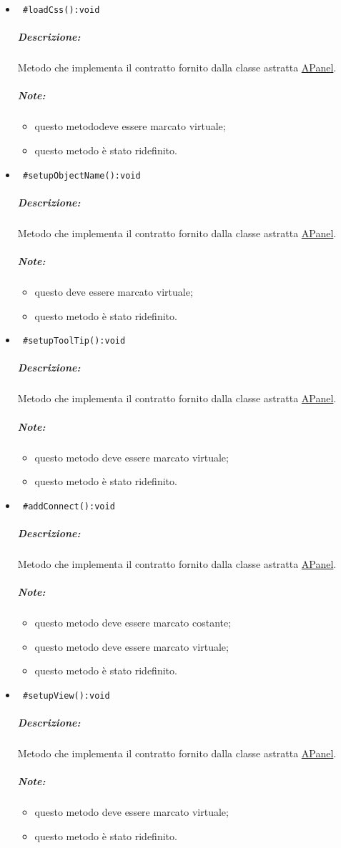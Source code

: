 \begin{itemize}
\item\color{blue}\verb! #loadCss():void!
\color{black} 
\subparagraph{Descrizione: }Metodo che implementa il contratto fornito dalla classe astratta \hyperref[speAPanel]{APanel}.
 \subparagraph{Note:}
 \begin{itemize}
  \item questo metododeve essere marcato virtuale;
 \item questo metodo è stato ridefinito.
 \end{itemize}
 
\item\color{blue}\verb! #setupObjectName():void!
\color{black}
\subparagraph{Descrizione: }Metodo che implementa il contratto fornito dalla classe astratta \hyperref[speAPanel]{APanel}.
 \subparagraph{Note:}
 \begin{itemize}
  \item questo deve essere marcato virtuale;
 \item questo metodo è stato ridefinito.
 \end{itemize}
 
\item\color{blue}\verb! #setupToolTip():void!
\color{black}
\subparagraph{Descrizione: }Metodo che implementa il contratto fornito dalla classe astratta \hyperref[speAPanel]{APanel}.
 \subparagraph{Note:}
 \begin{itemize}
 \item questo metodo deve essere marcato virtuale;
 \item questo metodo è stato ridefinito.
 \end{itemize}
 
\item\color{blue}\verb! #addConnect():void!
\color{black}
\subparagraph{Descrizione: }Metodo che implementa il contratto fornito dalla classe astratta \hyperref[speAPanel]{APanel}.
 \subparagraph{Note:}
 \begin{itemize}
 \item questo metodo deve essere marcato costante;
 \item questo metodo deve essere marcato virtuale;
 \item questo metodo è stato ridefinito.
 \end{itemize}
 
\item\color{blue}\verb! #setupView():void!
\color{black}
\subparagraph{Descrizione: }Metodo che implementa il contratto fornito dalla classe astratta \hyperref[speAPanel]{APanel}.
 \subparagraph{Note:}
 \begin{itemize}
 \item questo metodo deve essere marcato virtuale;
 \item questo metodo è stato ridefinito.
 \end{itemize}


\end{itemize}
